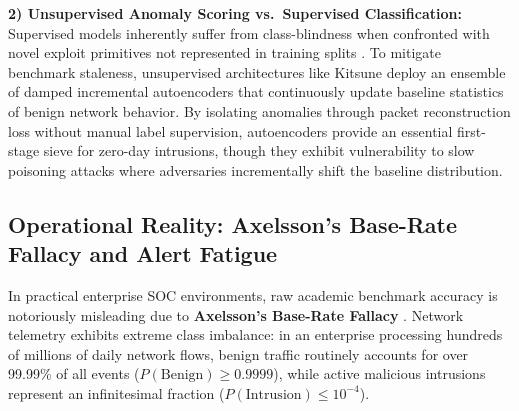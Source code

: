 \documentclass[conference,10pt,twocolumn,a4paper]{IEEEtran}
\begin{document}
\textbf{2) Unsupervised Anomaly Scoring vs.\ Supervised Classification:} Supervised models inherently suffer from class-blindness when confronted with novel exploit primitives not represented in training splits \cite{nist_sp_ai_100_2e2025}. To mitigate benchmark staleness, unsupervised architectures like Kitsune \cite{mirsky2018kitsune} deploy an ensemble of damped incremental autoencoders that continuously update baseline statistics of benign network behavior. By isolating anomalies through packet reconstruction loss without manual label supervision, autoencoders provide an essential first-stage sieve for zero-day intrusions, though they exhibit vulnerability to slow poisoning attacks where adversaries incrementally shift the baseline distribution.

\subsection{Operational Reality: Axelsson's Base-Rate Fallacy and Alert Fatigue}
In practical enterprise SOC environments, raw academic benchmark accuracy is notoriously misleading due to \textbf{Axelsson's Base-Rate Fallacy} \cite{axelsson2000base}. Network telemetry exhibits extreme class imbalance: in an enterprise processing hundreds of millions of daily network flows, benign traffic routinely accounts for over 99.99\% of all events ($P(\mathrm{Benign}) \ge 0.9999$), while active malicious intrusions represent an infinitesimal fraction ($P(\mathrm{Intrusion}) \le 10^{-4}$).
\end{document}
